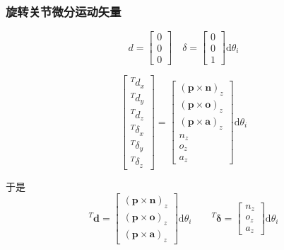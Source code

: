 \subsubsection{旋转关节微分运动矢量}

$$
d = \begin{bmatrix}0 \\ 0 \\ 0\end{bmatrix} \quad \delta = \begin{bmatrix}0 \\ 0 \\ 1\end{bmatrix} \mathrm{d} \theta_i
$$

$$
\begin{bmatrix}
{}^T d_x \\
{}^T d_y \\
{}^T d_z \\
{}^T \delta_x \\
{}^T \delta_y \\
{}^T \delta_z
\end{bmatrix}
=
\begin{bmatrix}
(\boldsymbol{p} \times \boldsymbol{n})_z \\
(\boldsymbol{p} \times \boldsymbol{o})_z \\
(\boldsymbol{p} \times \boldsymbol{a})_z \\
n_z \\
o_z \\
a_z
\end{bmatrix}
\mathrm{d}\theta_i
$$

于是
$$
{}^T \boldsymbol{d} = \begin{bmatrix}
(\boldsymbol{p} \times \boldsymbol{n})_z \\
(\boldsymbol{p} \times \boldsymbol{o})_z \\
(\boldsymbol{p} \times \boldsymbol{a})_z
\end{bmatrix} \mathrm{d}\theta_i
\qquad
{}^T \boldsymbol{\delta} = \begin{bmatrix}
n_z \\
o_z \\
a_z
\end{bmatrix} \mathrm{d}\theta_i
$$

